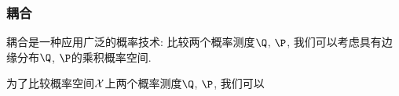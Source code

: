 %
%
%
%
%
%

%


\subsubsection{耦合}

耦合是一种应用广泛的概率技术: 比较两个概率测度$\Q$, $\P$, 我们可以考虑具有边缘分布$\Q$, $\P$的乘积概率空间. 

为了比较概率空间$\mathcal{X}$上两个概率测度$\Q$, $\P$, 我们可以

